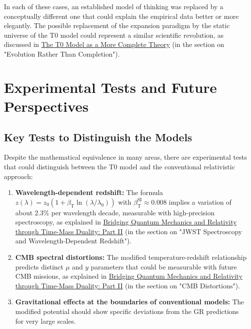 \documentclass[12pt,a4paper]{article}
\newcommand{\betaT}{\beta_{\text{T}}}
\begin{document}
	In each of these cases, an established model of thinking was replaced by a conceptually different one that could explain the empirical data better or more elegantly. The possible replacement of the expansion paradigm by the static universe of the T0 model could represent a similar scientific revolution, as discussed in \href{https://github.com/jpascher/T0-Time-Mass-Duality/tree/main/2/pdf/English/T0-ModelAsCompleteTheory_En.pdf}{The T0 Model as a More Complete Theory} (in the section on "Evolution Rather Than Completion").
	
	\section{Experimental Tests and Future Perspectives}
	\label{sec:experimental_tests}
	
	\subsection{Key Tests to Distinguish the Models}
	\label{subsec:key_tests}
	
	Despite the mathematical equivalence in many areas, there are experimental tests that could distinguish between the T0 model and the conventional relativistic approach:
	
	\begin{enumerate}
		\item \textbf{Wavelength-dependent redshift:} The formula $z(\lambda) = z_0 (1 + \betaT \ln(\lambda/\lambda_0))$ with $\betaT^{\text{SI}} \approx 0.008$ implies a variation of about 2.3\% per wavelength decade, measurable with high-precision spectroscopy, as explained in \href{https://github.com/jpascher/T0-Time-Mass-Duality/tree/main/2/pdf/English/QMRelTimeMassPart2En.pdf}{Bridging Quantum Mechanics and Relativity through Time-Mass Duality: Part II} (in the section on "JWST Spectroscopy and Wavelength-Dependent Redshift").
		
		\item \textbf{CMB spectral distortions:} The modified temperature-redshift relationship predicts distinct $\mu$ and $y$ parameters that could be measurable with future CMB missions, as explained in \href{https://github.com/jpascher/T0-Time-Mass-Duality/tree/main/2/pdf/English/QMRelTimeMassPart2En.pdf}{Bridging Quantum Mechanics and Relativity through Time-Mass Duality: Part II} (in the section on "CMB Distortions").
		
		\item \textbf{Gravitational effects at the boundaries of conventional models:} The modified potential should show specific deviations from the GR predictions for very large scales.
	\end{enumerate}
	
\end{document}
